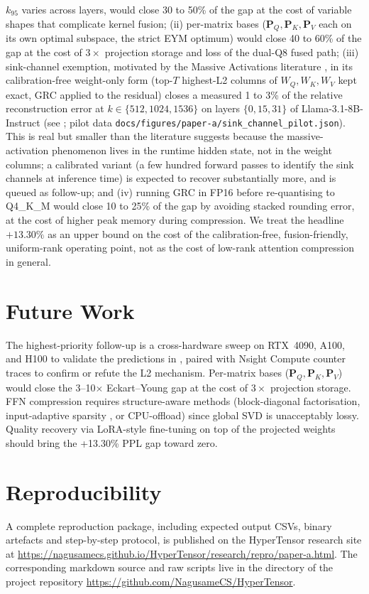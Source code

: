 \documentclass[11pt]{article}
\providecommand{\Pmat}{\mathbf{P}}
\begin{document}
\begin{itemize}
$k_{95}$ varies across layers, would close 30 to 50\% of the gap at the
cost of variable shapes that complicate kernel fusion; (ii) per-matrix
bases ($\Pmat_Q,\Pmat_K,\Pmat_V$ each on its own optimal subspace, the
strict EYM optimum) would close 40 to 60\% of the gap at the cost of
$3\times$ projection storage and loss of the dual-Q8 fused path; (iii)
sink-channel exemption, motivated by the Massive Activations literature
\cite{sun2024massive}, in its calibration-free weight-only form
(top-$T$ highest-L2 columns of $W_Q,W_K,W_V$ kept exact, GRC applied to
the residual) closes a measured 1 to 3\% of the relative reconstruction
error at $k\in\{512,1024,1536\}$ on layers $\{0,15,31\}$ of
Llama-3.1-8B-Instruct (see ; pilot data
\texttt{docs/figures/paper-a/sink\_channel\_pilot.json}). This is real
but smaller than the literature suggests because the massive-activation
phenomenon lives in the runtime hidden state, not in the weight
columns; a calibrated variant (a few hundred forward passes to identify
the sink channels at inference time) is expected to recover
substantially more, and is queued as follow-up; and (iv) running GRC in
FP16 before re-quantising to Q4\_K\_M would close 10 to 25\% of the gap
by avoiding stacked rounding error, at the cost of higher peak memory
during compression. We treat the headline $+13.30\%$ as an upper bound
on the cost of the calibration-free, fusion-friendly, uniform-rank
operating point, not as the cost of low-rank attention compression in
general.
\end{itemize}

\section{Future Work}
\label{sec:future}
The highest-priority follow-up is a cross-hardware sweep on RTX~4090, A100,
and H100 to validate the predictions in , paired with
Nsight Compute counter traces to confirm or refute the L2 mechanism.
Per-matrix bases ($\Pmat_Q,\Pmat_K,\Pmat_V$) would close the
3--10$\times$ Eckart--Young gap at the cost of $3\times$ projection storage.
FFN compression requires structure-aware methods (block-diagonal
factorisation, input-adaptive sparsity \cite{elhage2022superposition},
or CPU-offload) since global SVD is unacceptably lossy.  Quality recovery via
LoRA-style \cite{hu2021lora} fine-tuning on top of the projected weights
should bring the +13.30\% PPL gap toward zero.

\section{Reproducibility}
A complete reproduction package, including expected output CSVs,
binary artefacts and step-by-step protocol, is published on the
HyperTensor research site at
\url{https://nagusamecs.github.io/HyperTensor/research/repro/paper-a.html}.
The corresponding markdown source and raw scripts live in the
 directory of the project repository
\url{https://github.com/NagusameCS/HyperTensor}.
\end{document}
